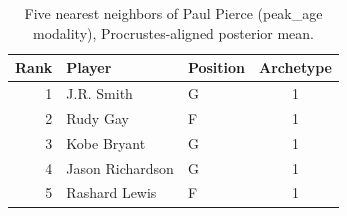 \begin{table}[htbp]
  \centering\small
  \begin{tabular}{rllc}
    \toprule
    Rank & Player & Position & Archetype \\
    \midrule
    1 & J.R. Smith & G & 1 \\
    2 & Rudy Gay & F & 1 \\
    3 & Kobe Bryant & G & 1 \\
    4 & Jason Richardson & G & 1 \\
    5 & Rashard Lewis & F & 1 \\
    \bottomrule
  \end{tabular}
  \caption{Five nearest neighbors of Paul Pierce (peak_age modality), Procrustes-aligned posterior mean.}
  \label{tab:Paul_Pierce_neighbors_peak_age}
\end{table}

